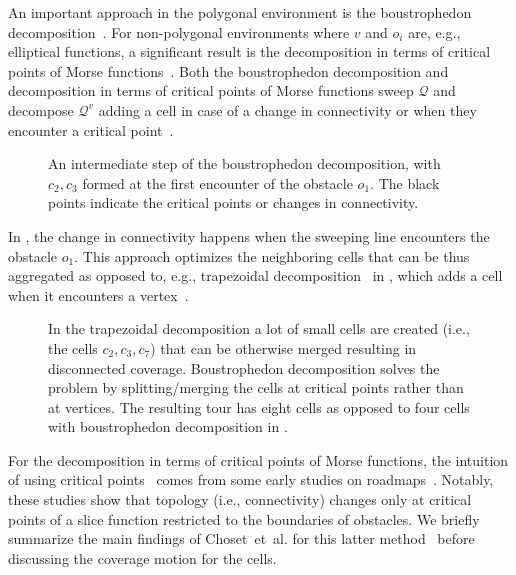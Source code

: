 An important approach in the polygonal environment is the boustrophedon decomposition~\citep{choset2000coverage}. For non-polygonal environments where $v$ and $o_i$ are, e.g., elliptical functions, a significant result is the decomposition in terms of critical points of Morse functions~\citep{choset2000exact}. Both the boustrophedon decomposition and decomposition in terms of critical points of Morse functions sweep $\mathcal{Q}$ and decompose $\mathcal{Q}^v$ adding a cell in case of a change in connectivity or when they encounter a critical point~\citep{choset2000coverage,choset2001coverage,choset2005principles}. 
\begin{figure}[h]
  \centering
  \selectfont
  
  \caption[Intermediate step of the boustrophedon decomposition]{An intermediate step of the boustrophedon decomposition, with $c_2,c_3$ formed at the first encounter of the obstacle $o_1$. The black points indicate the critical points or changes in connectivity.
  }
  \label{fig:bcd3}
\end{figure}
In , the change in connectivity happens when the sweeping line encounters the obstacle $o_1$. This approach optimizes the neighboring cells that can be thus aggregated as opposed to, e.g., trapezoidal decomposition~\citep{galceran2013survey} in , which adds a cell when it encounters a vertex~\citep{lavalle2006planning}.
\begin{figure}[h]
  \centering
  \selectfont
  
  \caption[Trapezoidal decomposition]{In the trapezoidal decomposition a lot of small cells are created (i.e., the cells $c_2,c_3,c_7$) that can be otherwise merged resulting in disconnected coverage. Boustrophedon decomposition solves the problem by splitting/merging the cells at critical points rather than at vertices. The resulting tour has eight cells as opposed to four cells with boustrophedon decomposition in .}
  \label{fig:trap}
\end{figure}
For the decomposition in terms of critical points of Morse functions, the intuition of using critical points~\citep{choset2000exact} comes from some early studies on roadmaps~\citep{canny1988complexity,canny1988constructing,canny1993opportunistic}. Notably, these studies show that topology (i.e., connectivity) changes only at critical points of a slice function restricted to the boundaries of obstacles. We briefly summarize the main findings of Choset~et~al. for this latter method~\citep{choset2000exact} before discussing the coverage motion for the cells.

